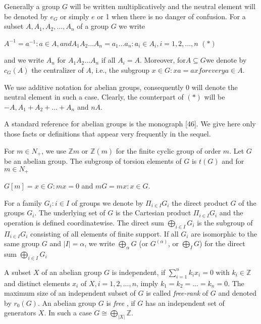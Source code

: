 \documentclass[12pt]{article}
\begin{document}
    Generally a group $G$ will be written multiplicatively and the neutral element will be denoted by $e_G$ or simply $e$
    or 1 when there is no danger of confusion. For a subset $A, A_1, A_2, \dotsc , A_n$ of a group $G$ we write


    $A^{-1} = {a^{-1} : a \in A}, and A_1 A_2 \dotsc A_n = {a_1 . . . a_n : a_i \in A_i, i = 1, 2, \dotsc , n}$    $ (*) $


    and we write $A_n$ for $A_1 A_2 \dotsc A_n$ if all $A_i = A$. Moreover, for$ A \subseteq G $we denote by $c_{G}(A)$ the centralizer of $A$,
    i.e., the subgroup ${x \in G : xa = ax for every a \in A}$.
    
    
        We use additive notation for abelian groups, consequently 0 will denote the neutral element in such a case.
    Clearly, the counterpart of $(*)$ will be $-A, A_1 + A_2 + \dotsc + A_n$ and $nA$.
    
    
        A standard reference for abelian groups is the monograph [46]. We give here only those facts or definitions
    that appear very frequently in the sequel.
    
    
        For $m \in N_+$, we use $\mathbb{Z}m$ or $\mathbb{Z}(m)$ for the finite cyclic group of order $m$. Let $G$ be an abelian group. The
    subgroup of torsion elements of $G$ is $t(G)$ and for $m \in N_+$
    
    
    $G[m] = {x \in G : mx = 0}$ and $mG = {mx : x \in G}$.
    
    
        For a family $ {G_i : i \in I} $ of groups we denote by $ \Pi_{i \in I} G_i $ the direct product $ G $ of the groups $ G_i $. The underlying
    set of $ G $ is the Cartesian product $ \Pi_{i \in I} G_i $ and the operation is defined coordinatewise. The direct sum $ \bigoplus_{i \in I} G_i $
    is the subgroup of $\Pi_{i \in I} G_i$ consisting of all elements of finite support. If all $ G_i $ are isomorphic to the same
    group $ G $ and $ |I| = \alpha $, we write $ \bigoplus_{\alpha} G $ (or $ G^{(\alpha)} $, or $ \bigoplus_I G $) for the direct sum $ \bigoplus_{i \in I} G_i $
    
    
        A subset $X$ of an abelian group $G$ is independent, if $ \sum_{i=1}^{n} k_i x_i = 0 $ with $ k_i \in \mathbb{Z} $ and distinct elements $ x_i $ of
    $ X, i = 1, 2, . . . , n $, imply $ k_1 = k_2 = . . . = k_n = 0 $. The maximum size of an independent subset of $ G $ is called
    \emph{free-rank} of $ G $ and denoted by $r_{0} (G) $. An abelian group $G$ is \emph{free} , if $ G $ has an independent set of generators $ X $.
    In such a case $ G \cong \bigoplus_{|X|} \mathbb{Z} $.
\end{document}
